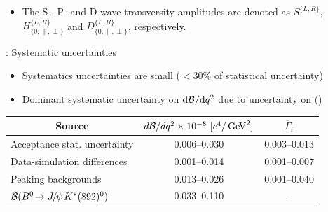 \documentclass[aspectratio=1610]{beamer}
\begin{document}
\begin{frame}
\begin{itemize}
\medskip
 
\item The S-, P- and D-wave transversity amplitudes are denoted as $S^{\{L,R\}}$, $H^{\{L,R\}}_{\{0,\parallel,\perp\}}$ and $D^{\{L,R\}}_{\{0,\parallel,\perp\}}$, respectively.
\end{itemize}
\end{frame}

\begin{frame}{\BdToKpimm: Systematic uncertainties}

\begin{itemize}
  \item Systematics uncertainties are small ($<30\%$ of statistical uncertainty)
  \item Dominant systematic uncertainty on $\mathrm{d}{\mathcal{B}}/\mathrm{d}{q^2}$ due to uncertainty on \mbox{\BF(\BdToJPsiKstP)}
\end{itemize}

\bigskip

\begin{mdframed}[linecolor=barcolor]
\begin{center}
\begin{tabular}{l|cc}
\multicolumn{1}{c|}{Source} & $d{\mathcal{B}}/d{q^2} \times 10^{-8}~[c^{4}/\mathrm{\,Ge\kern -0.1em V}^{2}]$ & $\overline{\Gamma}_{i}$ \\
\hline
Acceptance stat.\! uncertainty & 0.006--0.030 & 0.003--0.013 \\
Data-simulation differences & 0.001--0.014 & 0.001--0.007 \\
Peaking backgrounds & 0.013--0.026 & 0.001--0.040 \\
\hline
${\mathcal{B}}({{B}^0}\!\rightarrow {\ensuremath{{J\mskip -3mu/\mskip -2mu\psi\mskip 2mu}}}{\ensuremath{K}}^{*}(892)^{0})$ & 0.033--0.110 & -- \\
\end{tabular}
\end{center}
\end{mdframed}
\end{frame}

\end{document}
